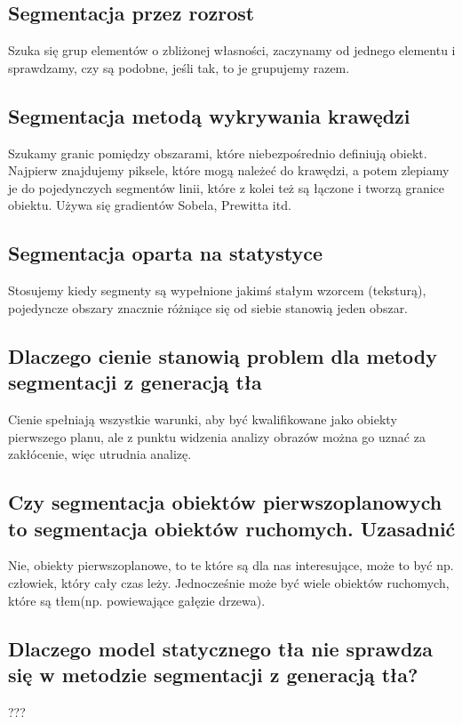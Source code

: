 \documentclass[a4paper, 12pt, titlepage]{article}
\begin{document}
\subsection{Segmentacja przez rozrost}
Szuka się grup elementów o zbliżonej własności, zaczynamy od jednego elementu i sprawdzamy, czy są podobne, jeśli tak, to je grupujemy razem.

\subsection{Segmentacja metodą wykrywania krawędzi}
Szukamy granic pomiędzy obszarami, które niebezpośrednio definiują obiekt. Najpierw znajdujemy piksele, które mogą należeć do krawędzi, a potem zlepiamy je do pojedynczych segmentów linii, które z kolei też są łączone i tworzą granice obiektu. Używa się gradientów Sobela, Prewitta itd.

\subsection{Segmentacja oparta na statystyce}
Stosujemy kiedy segmenty są wypełnione jakimś stałym wzorcem (teksturą), pojedyncze obszary znacznie różniące się od siebie stanowią jeden obszar.

\subsection{Dlaczego cienie stanowią problem dla metody segmentacji z generacją tła}
Cienie spełniają wszystkie warunki, aby być kwalifikowane jako obiekty pierwszego planu, ale z punktu widzenia analizy obrazów można go uznać za zakłócenie, więc utrudnia analizę.

\subsection{Czy segmentacja obiektów pierwszoplanowych to segmentacja obiektów ruchomych. Uzasadnić}
Nie, obiekty pierwszoplanowe, to te które są dla nas interesujące, może to być np. człowiek, który cały czas leży. Jednocześnie może być wiele obiektów ruchomych, które są tłem(np. powiewające gałęzie drzewa).

\subsection{Dlaczego model statycznego tła nie sprawdza się w metodzie segmentacji z generacją tła?}???
\end{document}
